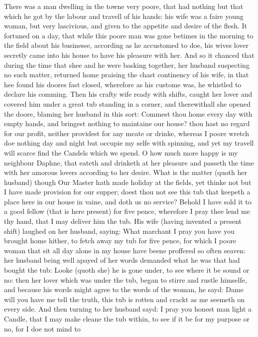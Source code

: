 There was a man dwelling in the towne very poore, that had nothing but that
which he got by the labour and travell of his hands: his wife was a faire young
woman, but very lascivious, and given to the appetite and desire of the flesh.
It fortuned on a day, that while this poore man was gone betimes in the morning
to the field about his businesse, according as he accustomed to doe, his wives
lover secretly came into his house to have his pleasure with her. And so it
chanced that during the time that shee and he were basking together, her
husband suspecting no such matter, returned home praising the chast continency
of his wife, in that hee found his doores fast closed, wherefore as his custome
was, he whistled to declare his comming. Then his crafty wife ready with
shifts, caught her lover and covered him under a great tub standing in a
corner, and therewithall she opened the doore, blaming her husband in this
sort: Commest thou home every day with empty hands, and bringest nothing to
maintaine our house? thou hast no regard for our profit, neither providest for
any meate or drinke, whereas I poore wretch doe nothing day and night but
occupie my selfe with spinning, and yet my travell will scarce find the Candels
which we spend. O how much more happy is my neighbour Daphne, that eateth and
drinketh at her pleasure and passeth the time with her amorous lovers according
to her desire. What is the matter (quoth her husband) though Our Master hath
made holiday at the fields, yet thinke not but I have made provision for our
supper; doest thou not see this tub that keepeth a place here in our house in
vaine, and doth us no service? Behold I have sold it to a good fellow (that is
here present) for five pence, wherefore I pray thee lend me thy hand, that I
may deliver him the tub. His wife (having invented a present shift) laughed on
her husband, saying: What marchant I pray you have you brought home hither, to
fetch away my tub for five pence, for which I poore woman that sit all day
alone in my house have beene proffered so often seaven: her husband being well
apayed of her words demanded what he was that had bought the tub: Looke (quoth
she) he is gone under, to see where it be sound or no: then her lover which was
under the tub, began to stirre and rustle himselfe, and because his words might
agree to the words of the woman, he sayd: Dame will you have me tell the truth,
this tub is rotten and crackt as me seemeth on every side. And then turning to
her husband sayd: I pray you honest man light a Candle, that I may make cleane
the tub within, to see if it be for my purpose or no, for I doe not mind to
